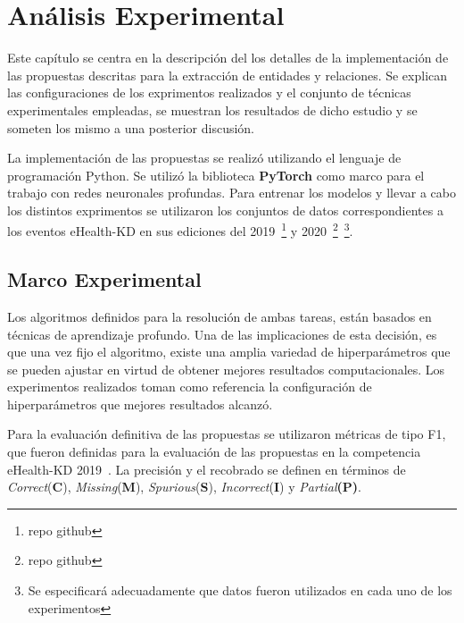 \chapter{Análisis Experimental}\label{chapter:experiments}

Este capítulo se centra en la descripción del los detalles de la implementación de las propuestas descritas para la extracción de entidades y relaciones.
Se explican las configuraciones de los exprimentos realizados y el conjunto de técnicas experimentales empleadas, se muestran los resultados de dicho estudio y se someten los mismo a una posterior discusión.

La implementación de las propuestas se realizó utilizando el lenguaje de programación Python.
Se utilizó la biblioteca \textbf{PyTorch} como marco para el trabajo con redes neuronales profundas.
Para entrenar los modelos y llevar a cabo los distintos exprimentos se utilizaron los conjuntos de datos correspondientes a los eventos eHealth-KD en sus ediciones del 2019~\footnote{repo github} y 2020~\footnote{repo github}~\footnote{Se especificará adecuadamente que datos fueron utilizados en cada uno de los experimentos}.

\section{Marco Experimental}

Los algoritmos definidos para la resolución de ambas tareas, están basados en técnicas de aprendizaje profundo.
Una de las implicaciones de esta decisión, es que una vez fijo el algoritmo, existe una amplia variedad de hiperparámetros que se pueden ajustar en virtud de obtener mejores resultados computacionales.
Los experimentos realizados toman como referencia la configuración de hiperparámetros que mejores resultados alcanzó.

Para la evaluación definitiva de las propuestas se utilizaron métricas de tipo F1, que fueron definidas para la evaluación de las propuestas en la competencia eHealth-KD 2019~\cite{ehalth19}.
La precisión y el recobrado se definen en términos de \textit{Correct}(\textbf{C}), \textit{Missing}(\textbf{M}), \textit{Spurious}(\textbf{S}), \textit{Incorrect}(\textbf{I}) y \textit{Partial}\textbf{(P)}.

